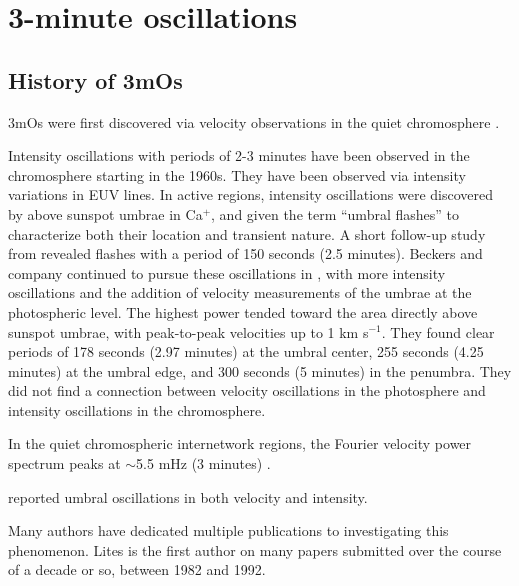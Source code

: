
\clearpage
\section{3-minute oscillations}



\subsection{History of 3mOs}


3mOs were
first discovered via velocity observations in the quiet chromosphere
\citep{Jensen1963}.

Intensity oscillations with periods of 2-3 minutes have been observed in
the chromosphere starting in the 1960s.
They have been observed
via intensity variations in EUV lines.
In active regions, intensity oscillations were discovered by
\cite{Beckers1969} above sunspot umbrae in Ca$^{+}$,
and given the term ``umbral flashes'' to characterize
both their location and transient nature.
A short follow-up study from \cite{Wittmann1969} revealed
flashes with a period of 150 seconds (2.5 minutes).
Beckers and company continued to pursue these oscillations in
\citep{Beckers1972},
with more intensity oscillations and the addition of velocity measurements
of the umbrae at the photospheric level.
The highest power tended toward the area
directly above sunspot umbrae, with peak-to-peak velocities up to
1 km s$^{-1}$.
They found clear periods of
178 seconds (2.97 minutes) at the umbral center,
255 seconds (4.25 minutes) at the umbral edge, and
300 seconds (5 minutes) in the penumbra.
They did not find a connection between velocity oscillations in the photosphere
and intensity oscillations in the chromosphere.

In the quiet chromospheric internetwork regions,
the Fourier velocity power spectrum peaks at
$\sim$5.5 mHz (3 minutes)
\citep{Orrall1966}.

\cite{Giovanelli1972} reported umbral oscillations in both velocity and intensity.

Many authors have dedicated multiple publications to investigating
this phenomenon. Lites is the first author on many papers submitted
over the course of a decade or so, between 1982 and 1992.

